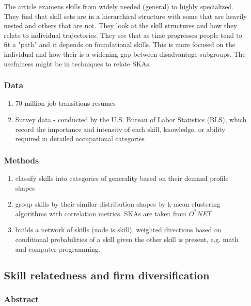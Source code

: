 \documentclass[12pt]{article}
\begin{document}
The article examens skills from widely needed (general) to highly specialized. They find that skill sets are in a hierarchical structure with some that are heavily nested and others that are not. They look at the skill structures and how they relate to individual trajectories. They see that as time progresses people tend to fit a "path" and it depends on foundational skills. This is more focused on the individual and how their is a widening gap between disadvantage subgroups. The usefulness might be in techniques to relate SKAs.

\subsubsection*{Data}

\begin{enumerate}
    \item 70 million job transitions resumes
    \item Survey data - conducted by the U.S. Bureau of Labor Statistics (BLS), which record the importance and intensity of each skill, knowledge, or ability required in detailed occupational categories
\end{enumerate}

\subsubsection*{Methods}

\begin{enumerate}
    \item classify skills into categories of generality based on their demand profile shapes
    \item group skills by their similar distribution shapes by k-mean clustering algorithms with correlation metrics. SKAs are taken from \href{https://www.onetonline.org}{$O^*NET$}
    \item builds a network of skills (node is skill), weighted directions based on conditional probabilities of a skill given the other skill is present, e.g. math and computer programming.
\end{enumerate}


\subsection*{Skill relatedness and firm diversification\cite{skill_relatedness}}

\subsubsection*{Abstract}
\end{document}

